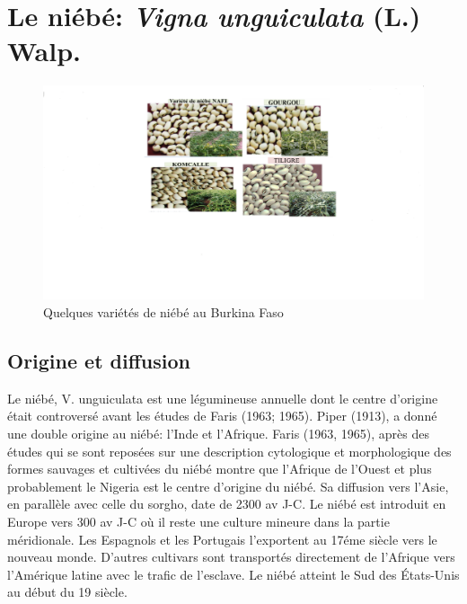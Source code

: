 \documentclass[a4paper,11pt]{article}
\begin{document}





\section{Le niébé: \emph{Vigna unguiculata} (L.) Walp.}
\begin{figure}%
  \begin{center}
   \includegraphics[width=12cm]{images/graines_niebe}
  \end{center}
\caption{Quelques variétés de niébé au Burkina Faso}
\end{figure}

\newpage



\subsection{Origine et diffusion}
Le niébé, V. unguiculata est une légumineuse annuelle dont le centre
d’origine était controversé avant les études de Faris (1963;
1965). Piper (1913), a donné une double origine au niébé: l’Inde et
l’Afrique. Faris (1963, 1965), après des études qui se sont reposées
sur une description cytologique et morphologique des formes sauvages
et cultivées du niébé montre que l’Afrique de l’Ouest et plus
probablement le Nigeria est le centre d’origine du niébé. Sa diffusion
vers l’Asie, en parallèle avec celle du sorgho, date de 2300 av
J-C. Le niébé est introduit en Europe vers 300 av J-C où il reste une
culture mineure dans la partie méridionale. Les Espagnols et les
Portugais l’exportent au 17éme siècle vers le nouveau monde. D’autres
cultivars sont transportés directement de l’Afrique vers l’Amérique
latine avec le trafic de l’esclave. Le niébé atteint le Sud des
États-Unis au début du 19\ieme{} siècle\cite{Sawadogo_2009}.
\end{document}
